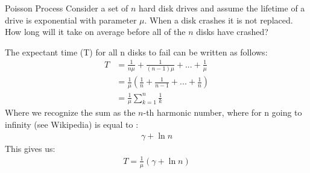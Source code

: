 \begin{problem}{Poisson Process}
Consider a set of $n$ hard disk drives and assume the lifetime of a drive is exponential with parameter $\mu$. When a disk crashes it is not replaced. How long will it take on average before all of the $n$ disks have crashed?
\end{problem}

\begin{solution}
The expectant time (T) for all n disks to fail can be written as follows:
\begin{align*}
    T&= \frac{1}{n\mu }+ \frac{1}{(n-1)\mu} + ... +\frac{1}{\mu}
    \\
    &= \frac{1}{\mu}(\frac{1}{n} + \frac{1}{n-1}+ ... +\frac{1}{n})\\
    &= \frac{1}{\mu} \sum _{k=1} ^{n} \frac{1}{k}
\end{align*}
Where we recognize the sum as the $n$-th harmonic number, where for n going to infinity (see Wikipedia) is equal to :
\begin{align*}
    \gamma + \ln{n}
\end{align*}
This gives us:
\begin{align*}
    T= \frac{1}{\mu} (\gamma + \ln{n})
\end{align*}
\end{solution}